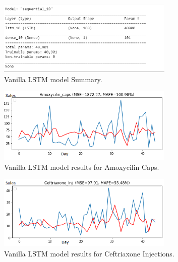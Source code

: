 \documentclass[12pt]{report}
\begin{document}
\begin{figure}[H]%
  \begin {center}
  \includegraphics[width=0.75\textwidth]{VanillaSummary.png}
  \caption{Vanilla LSTM model Summary.}
  \label{fig:ecg}
  \end {center}
\end{figure}
  
  
  \begin{figure}[H]%
    \begin {center}
    \includegraphics[width=0.75\textwidth]{images/vanilla1 (2)A.png}
    \caption{Vanilla LSTM model results for Amoxycilin Caps.}
    \label{fig:ecg}
    \end {center}
  \end{figure}
 
  \begin{figure}[H]%
    \begin {center}
    \includegraphics[width=0.75\textwidth]{images/vanilla1 (2)B.png}
    \caption{Vanilla LSTM model results for Ceftriaxone Injections.}
    \label{fig:ecg}
    \end {center}
  \end{figure}
 
\end{document}
